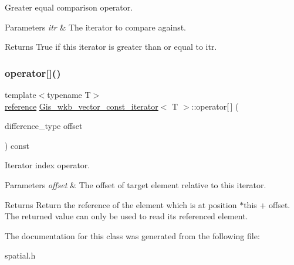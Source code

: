 Greater equal comparison operator. 


\begin{DoxyParams}{Parameters}
{\em itr} & The iterator to compare against. \\
\hline
\end{DoxyParams}
\begin{DoxyReturn}{Returns}
True if this iterator is greater than or equal to itr. 
\end{DoxyReturn}
\mbox{\label{classGis__wkb__vector__const__iterator_ad20dd8d13fb86ff0ab478ef11c400772}} 
\subsubsection{\texorpdfstring{operator[]()}{operator[]()}}
{\footnotesize\ttfamily template$<$typename T$>$ \\
\mbox{\hyperlink{classGis__wkb__vector__const__iterator_a320ffe7a48e9c6440eb76d321ff8c5a2}{reference}} \mbox{\hyperlink{classGis__wkb__vector__const__iterator}{Gis\+\_\+wkb\+\_\+vector\+\_\+const\+\_\+iterator}}$<$ T $>$\+::operator\mbox{[}$\,$\mbox{]} (\begin{DoxyParamCaption}\item[{difference\+\_\+type}]{offset }\end{DoxyParamCaption}) const\hspace{0.3cm}{\ttfamily [inline]}}



Iterator index operator. 


\begin{DoxyParams}{Parameters}
{\em offset} & The offset of target element relative to this iterator. \\
\hline
\end{DoxyParams}
\begin{DoxyReturn}{Returns}
Return the reference of the element which is at position $\ast$this + offset. The returned value can only be used to read its referenced element. 
\end{DoxyReturn}


The documentation for this class was generated from the following file\+:\begin{DoxyCompactItemize}
\item 
spatial.\+h\end{DoxyCompactItemize}
